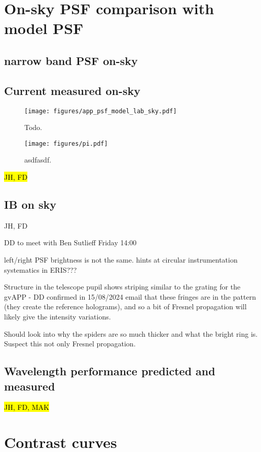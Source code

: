 \documentclass{aa}
\begin{document}
\section{On-sky PSF comparison with model PSF}


\subsection{narrow band PSF on-sky}

\subsection{Current measured on-sky}

\begin{figure*}
    \centering
    \texttt{[image: figures/app\_psf\_model\_lab\_sky.pdf]}
    \caption{Todo.}
    \label{fig:app_psf_comp}
\end{figure*}

\begin{figure}
    \centering
    \texttt{[image: figures/pi.pdf]}
    \caption{asdfasdf.}
    \label{fig:lprime_cc}
\end{figure}

\hl{JH, FD}

\subsection{IB on sky}

JH, FD

DD to meet with Ben Sutlieff Friday 14:00

left/right PSF brightness is not the same. hints at circular instrumentation systematics in ERIS???

Structure in the telescope pupil shows striping similar to the grating for the gvAPP - DD confirmed in 15/08/2024 email that these fringes are in the pattern (they create the reference holograms), and so a bit of Fresnel propagation will likely give the intensity variations.

Should look into why the spiders are so much thicker and what the bright ring is. Suspect this not only Fresnel propagation.

\subsection{Wavelength performance predicted and measured}
\hl{JH, FD, MAK}

\section{Contrast curves}
\end{document}
